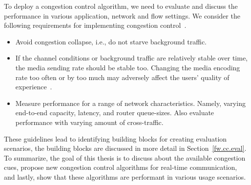 

To deploy a congestion control algorithm, we need to evaluate and discuss the
performance in various application, network and flow settings. We consider the
following requirements for implementing congestion
control~\cite{draft.rmcat.evaluate}.

\begin{itemize}
\setlength{\itemsep}{0pt}

\item Avoid congestion collapse, i.e., do not starve background traffic.

\item If the channel conditions or background traffic are relatively stable
over time, the media sending rate should be stable too. Changing the media
encoding rate too often or by too much may adversely affect the users' quality
of experience~\cite{Zink03subjectiveimpression}.

\item Measure performance for a range of network characteristics. Namely,
varying end-to-end capacity, latency, and router queue-sizes. Also evaluate
performance with varying amount of cross-traffic.


\end{itemize}

These guidelines lead to identifying building blocks for creating evaluation
scenarios, the building blocks are discussed in more detail in
Section~\ref{fw.cc.eval}. To summarize, the goal of this thesis is to discuss
about the available congestion cues, propose new congestion control algorithms
for real-time communication, and lastly, show that these algorithms are
performant in various usage scenarios.



